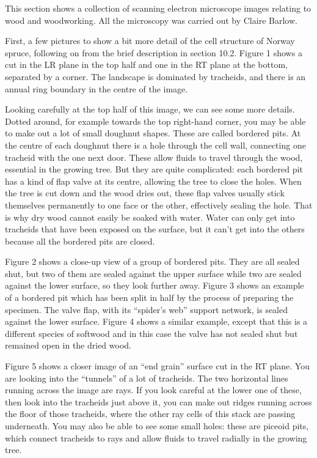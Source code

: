   This section shows a collection of scanning electron microscope images 
  relating to wood and woodworking. All the microscopy was carried out by 
  Claire Barlow. 

  First, a few pictures to show a bit more detail of the cell structure of 
  Norway spruce, following on from the brief description in section 10.2. 
  Figure 1 shows a cut in the LR plane in the top half and one in the RT plane 
  at the bottom, separated by a corner. The landscape is dominated by 
  tracheids, and there is an annual ring boundary in the centre of the image. 

  Looking carefully at the top half of this image, we can see some more 
  details. Dotted around, for example towards the top right-hand corner, you 
  may be able to make out a lot of small doughnut shapes. These are called 
  bordered pits. At the centre of each doughnut there is a hole through the 
  cell wall, connecting one tracheid with the one next door. These allow fluids 
  to travel through the wood, essential in the growing tree. But they are quite 
  complicated: each bordered pit has a kind of flap valve at its centre, 
  allowing the tree to close the holes. When the tree is cut down and the wood 
  dries out, these flap valves usually stick themselves permanently to one face 
  or the other, effectively sealing the hole. That is why dry wood cannot 
  easily be soaked with water. Water can only get into tracheids that have been 
  exposed on the surface, but it can’t get into the others because all the 
  bordered pits are closed. 

  Figure 2 shows a close-up view of a group of bordered pits. They are all 
  sealed shut, but two of them are sealed against the upper surface while two 
  are sealed against the lower surface, so they look further away. Figure 3 
  shows an example of a bordered pit which has been split in half by the 
  process of preparing the specimen. The valve flap, with its ``spider's web'' 
  support network, is sealed against the lower surface. Figure 4 shows a 
  similar example, except that this is a different species of softwood and in 
  this case the valve has not sealed shut but remained open in the dried wood. 

  Figure 5 shows a closer image of an “end grain” surface cut in the RT plane. 
  You are looking into the “tunnels” of a lot of tracheids. The two horizontal 
  lines running across the image are rays. If you look careful at the lower one 
  of these, then look into the tracheids just above it, you can make out ridges 
  running across the floor of those tracheids, where the other ray cells of 
  this stack are passing underneath. You may also be able to see some small 
  holes: these are piceoid pits, which connect tracheids to rays and allow 
  fluids to travel radially in the growing tree. 

